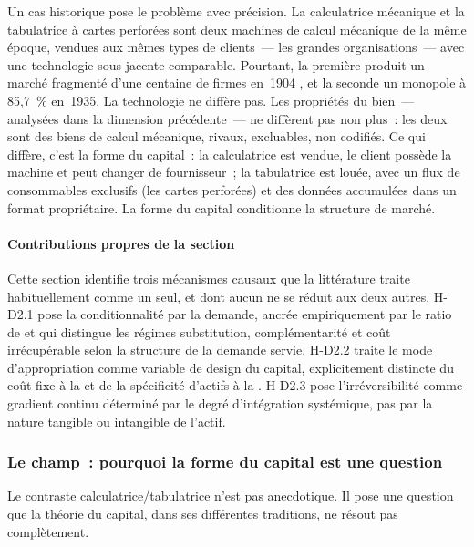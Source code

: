 Un cas historique pose le problème avec précision. La calculatrice mécanique et la tabulatrice à cartes perforées sont deux machines de calcul mécanique de la même époque, vendues aux mêmes types de clients~--- les grandes organisations~--- avec une technologie sous-jacente comparable. Pourtant, la première produit un marché fragmenté d'une centaine de firmes en~1904 \parencite{cortada_before_1993}, et la seconde un monopole à 85,7~\% en~1935. La technologie ne diffère pas. Les propriétés du bien~--- analysées dans la dimension précédente~--- ne diffèrent pas non plus~: les deux sont des biens de calcul mécanique, rivaux, excluables, non codifiés. Ce qui diffère, c'est la forme du capital~: la calculatrice est vendue, le client possède la machine et peut changer de fournisseur~; la tabulatrice est louée, avec un flux de consommables exclusifs (les cartes perforées) et des données accumulées dans un format propriétaire. La forme du capital conditionne la structure de marché.

\paragraph{Contributions propres de la section}
Cette section identifie trois mécanismes causaux que la littérature traite habituellement comme un seul, et dont aucun ne se réduit aux deux autres. H-D2.1 pose la conditionnalité par la demande, ancrée empiriquement par le ratio de \textcite{field_magnetic_1992} et qui distingue les régimes substitution, complémentarité et coût irrécupérable selon la structure de la demande servie. H-D2.2 traite le mode d'appropriation comme variable de design du capital, explicitement distincte du coût fixe à la \textcite{de_ridder_2024} et de la spécificité d'actifs à la \textcite{williamson_economic_1985}. H-D2.3 pose l'irréversibilité comme gradient continu déterminé par le degré d'intégration systémique, pas par la nature tangible ou intangible de l'actif.

\subsubsection{Le champ~: pourquoi la forme du capital est une question}

Le contraste calculatrice/tabulatrice n'est pas anecdotique. Il pose une question que la théorie du capital, dans ses différentes traditions, ne résout pas complètement.

